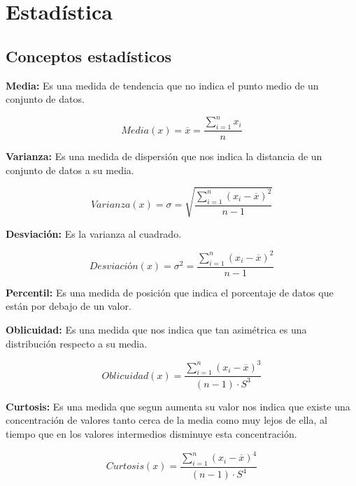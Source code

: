 \section{Estadística}

\subsection{Conceptos estadísticos}
\textbf{Media:} Es una medida de tendencia que no indica el punto medio de un conjunto de datos\cite{media}.

\begin{equation} 
Media(x) = \overline{x} = \frac{\sum_{i=1}^{n}x_{i}}{n}
\end{equation}

\textbf{Varianza:} Es una medida de dispersión que nos indica la distancia de un conjunto de datos a su media\cite{varianza}.

\begin{equation} 
Varianza(x) =  \sigma = \sqrt{\frac{\sum_{i=1}^{n}(x_{i}-\overline{x})^{2}}{n-1}}
\end{equation}

\textbf{Desviación:} Es la varianza al cuadrado\cite{varianza}.

\begin{equation} 
Desviación(x) =  \sigma^{2} = \frac{\sum_{i=1}^{n}(x_{i}-\overline{x})^{2}}{n-1}
\end{equation}

\textbf{Percentil:} Es una medida de posición que indica el porcentaje de datos que están por debajo de un valor\cite{percentil}.

\textbf{Oblicuidad:} Es una medida que nos indica que tan asimétrica es una distribución respecto a su media\cite{oblicuidad}.

\begin{equation} 
Oblicuidad(x) = \frac{\sum_{i=1}^{n}(x_{i}-\overline{x})^3}{(n-1)\cdot S^3}
\end{equation}

\textbf{Curtosis:} Es una medida que segun aumenta su valor nos indica que existe una concentración de valores tanto cerca de la media como muy lejos de ella, al tiempo que en los valores intermedios disminuye esta concentración\cite{curtosis}. 

\begin{equation} 
Curtosis(x) = \frac{\sum_{i=1}^{n}(x_{i}-\overline{x})^4}{(n-1)\cdot S^4}
\end{equation}
	
